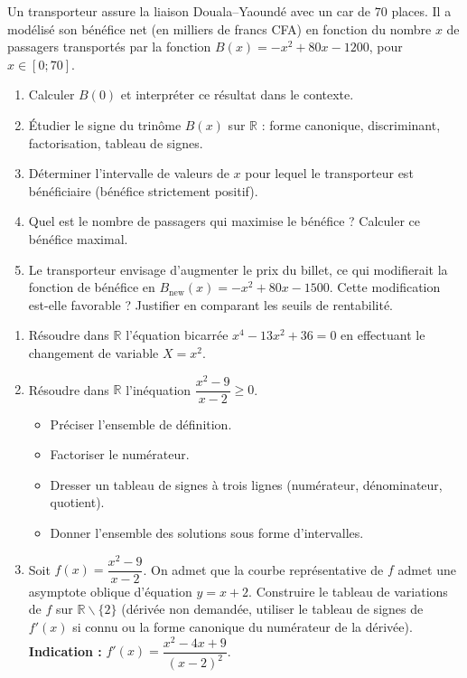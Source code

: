 \documentclass[11pt]{article}
\def\setminus{\mathbin{\backslash}}\let\smallsetminus\setminus
\begin{document}
\begin{exercice}
Un transporteur assure la liaison Douala--Yaoundé avec un car de $70$ places. Il a modélisé son bénéfice net (en milliers de francs CFA) en fonction du nombre $x$ de passagers transportés par la fonction $B(x) = -x^2 + 80x - 1200$, pour $x \in [0; 70]$.
\begin{enumerate}
    \item Calculer $B(0)$ et interpréter ce résultat dans le contexte.
    \item Étudier le signe du trinôme $B(x)$ sur $\mathbb{R}$ : forme canonique, discriminant, factorisation, tableau de signes.
    \item Déterminer l'intervalle de valeurs de $x$ pour lequel le transporteur est bénéficiaire (bénéfice strictement positif).
    \item Quel est le nombre de passagers qui maximise le bénéfice ? Calculer ce bénéfice maximal.
    \item Le transporteur envisage d'augmenter le prix du billet, ce qui modifierait la fonction de bénéfice en $B_{\text{new}}(x) = -x^2 + 80x - 1500$. Cette modification est-elle favorable ? Justifier en comparant les seuils de rentabilité.
\end{enumerate}
\end{exercice}

\begin{exercice}
\begin{enumerate}
    \item Résoudre dans $\mathbb{R}$ l'équation bicarrée $x^4 - 13x^2 + 36 = 0$ en effectuant le changement de variable $X = x^2$.
    \item Résoudre dans $\mathbb{R}$ l'inéquation $\dfrac{x^2 - 9}{x - 2} \ge 0$.
    \begin{itemize}
        \item Préciser l'ensemble de définition.
        \item Factoriser le numérateur.
        \item Dresser un tableau de signes à trois lignes (numérateur, dénominateur, quotient).
        \item Donner l'ensemble des solutions sous forme d'intervalles.
    \end{itemize}
    \item Soit $f(x) = \dfrac{x^2 - 9}{x - 2}$. On admet que la courbe représentative de $f$ admet une asymptote oblique d'équation $y = x + 2$. Construire le tableau de variations de $f$ sur $\mathbb{R} \setminus \{2\}$ (dérivée non demandée, utiliser le tableau de signes de $f'(x)$ si connu ou la forme canonique du numérateur de la dérivée). \textbf{Indication :} $f'(x) = \dfrac{x^2 - 4x + 9}{(x-2)^2}$.
\end{enumerate}
\end{exercice}
\end{document}
